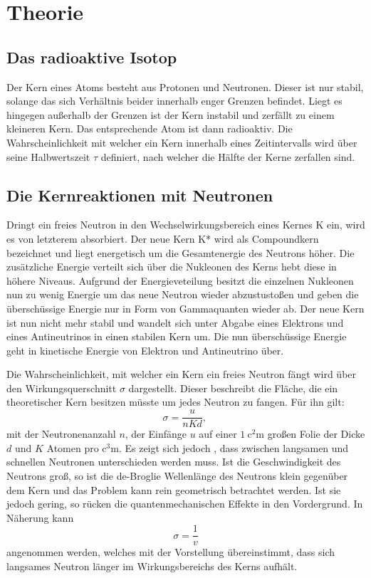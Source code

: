 
\section{Theorie}
\label{sec:Theorie}
\subsection{Das radioaktive Isotop}
Der Kern eines Atoms besteht aus Protonen und Neutronen. Dieser ist nur stabil, solange das sich Verhältnis beider innerhalb enger Grenzen befindet. Liegt es hingegen außerhalb der Grenzen ist der Kern instabil und zerfällt zu einem kleineren Kern. Das entsprechende Atom ist dann radioaktiv. Die Wahrscheinlichkeit mit welcher ein Kern innerhalb eines Zeitintervalls wird über seine Halbwertszeit $\tau$ definiert, nach welcher die Hälfte der Kerne zerfallen sind.

\subsection{Die Kernreaktionen mit Neutronen}
Dringt ein freies Neutron in den Wechselwirkungsbereich eines Kernes K ein, wird es von letzterem absorbiert. Der neue Kern K* wird als Compoundkern bezeichnet und liegt energetisch um die Gesamtenergie des Neutrons höher. Die zusätzliche Energie verteilt sich über die Nukleonen des Kerns hebt diese in höhere Niveaus. Aufgrund der Energieveteilung besitzt die einzelnen Nukleonen nun zu wenig Energie um das neue Neutron wieder abzustustoßen und geben die überschüssige Energie nur in Form von Gammaquanten wieder ab. Der neue Kern ist nun nicht mehr stabil und wandelt sich unter Abgabe eines Elektrons und eines Antineutrinos in einen stabilen Kern um. Die nun überschüssige Energie geht in kinetische Energie von Elektron und Antineutrino über.


Die Wahrscheinlichkeit, mit welcher ein Kern ein freies Neutron fängt wird über den Wirkungsquerschnitt $\sigma$ dargestellt. Dieser beschreibt die Fläche, die ein theoretischer Kern besitzen müsste um jedes Neutron zu fangen. Für ihn gilt:
\begin{equation}
  \sigma = \frac{u}{n K d}\text{, }
\end{equation}
mit der Neutronenanzahl $n$, der Einfänge $u$ auf einer $\SI{1}{\square\centi\meter}$ großen Folie der Dicke $d$ und $K$ Atomen pro $\si{\cubic\centi\meter}$.
 Es zeigt sich jedoch , dass zwischen langsamen und schnellen Neutronen unterschieden werden muss. Ist die Geschwindigkeit des Neutrons groß, so ist die de-Broglie Wellenlänge des Neutrons klein gegenüber dem Kern und das Problem kann rein geometrisch betrachtet werden. Ist sie jedoch gering, so rücken die quantenmechanischen Effekte in den Vordergrund. In Näherung kann
 \begin{equation}
   \sigma = \frac{1}{v}
 \end{equation}
 angenommen werden, welches mit der Vorstellung übereinstimmt, dass sich langsames Neutron länger im Wirkungsbereichs des Kerns aufhält.
